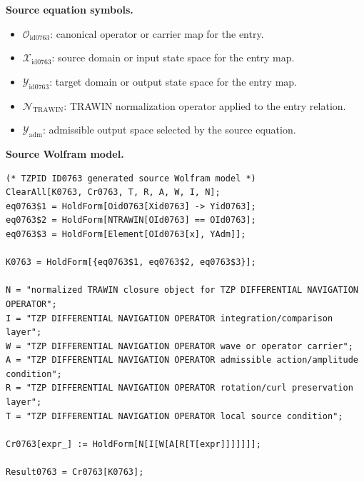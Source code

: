 \begin{minipage}[t]{0.49\linewidth}
\begingroup
\small
\raggedright
\textbf{Source equation symbols.}\par
\begin{itemize}[leftmargin=1.35em,itemsep=1pt,topsep=1pt,parsep=0pt]
    \item $\mathcal{O}_{\mathrm{id0763}}$: canonical operator or carrier map for the entry.
    \item $\mathcal{X}_{\mathrm{id0763}}$: source domain or input state space for the entry map.
    \item $\mathcal{Y}_{\mathrm{id0763}}$: target domain or output state space for the entry map.
    \item $\mathcal{N}_{\mathrm{TRAWIN}}$: TRAWIN normalization operator applied to the entry relation.
    \item $\mathcal{Y}_{\mathrm{adm}}$: admissible output space selected by the source equation.
\end{itemize}
\endgroup
\end{minipage}\hfill
\begin{minipage}[t]{0.47\linewidth}
\begingroup
\scriptsize
\raggedright
\textbf{Source Wolfram model.}\par
\begin{Verbatim}[fontsize=\tiny,breaklines=true,breakanywhere=true]
(* TZPID ID0763 generated source Wolfram model *)
ClearAll[K0763, Cr0763, T, R, A, W, I, N];
eq0763$1 = HoldForm[Oid0763[Xid0763] -> Yid0763];
eq0763$2 = HoldForm[NTRAWIN[OId0763] == OId0763];
eq0763$3 = HoldForm[Element[OId0763[x], YAdm]];

K0763 = HoldForm[{eq0763$1, eq0763$2, eq0763$3}];

N = "normalized TRAWIN closure object for TZP DIFFERENTIAL NAVIGATION OPERATOR";
I = "TZP DIFFERENTIAL NAVIGATION OPERATOR integration/comparison layer";
W = "TZP DIFFERENTIAL NAVIGATION OPERATOR wave or operator carrier";
A = "TZP DIFFERENTIAL NAVIGATION OPERATOR admissible action/amplitude condition";
R = "TZP DIFFERENTIAL NAVIGATION OPERATOR rotation/curl preservation layer";
T = "TZP DIFFERENTIAL NAVIGATION OPERATOR local source condition";

Cr0763[expr_] := HoldForm[N[I[W[A[R[T[expr]]]]]]];

Result0763 = Cr0763[K0763];
\end{Verbatim}
\endgroup
\end{minipage}

